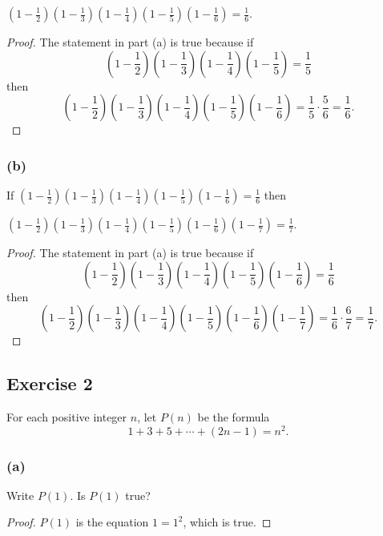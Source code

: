 \documentclass[14pt]{extarticle}
\newcommand{\dps}{\displaystyle}
\begin{document}
$\dps \left(1 - \frac{1}{2}\right)\left(1 - \frac{1}{3}\right)\left(1 - \frac{1}{4}\right)\left(1 - \frac{1}{5}\right)\left(1 - \frac{1}{6}\right) = \frac{1}{6}$.

\begin{proof}
    The statement in part (a) is true because if
    \[
        \dps \left(1 - \frac{1}{2}\right)\left(1 - \frac{1}{3}\right)\left(1 - \frac{1}{4}\right)\left(1 - \frac{1}{5}\right) = \frac{1}{5}
    \]
    then
    \[\dps \left(1 - \frac{1}{2}\right)\left(1 - \frac{1}{3}\right)\left(1 - \frac{1}{4}\right)\left(1 - \frac{1}{5}\right)\left(1 - \frac{1}{6}\right) = \frac{1}{5} \cdot \frac{5}{6} = \frac{1}{6}.
    \]
\end{proof}

\subsubsection{(b)}
If $\dps \left(1 - \frac{1}{2}\right)\left(1 - \frac{1}{3}\right)\left(1 - \frac{1}{4}\right)\left(1 - \frac{1}{5}\right)\left(1 - \frac{1}{6}\right) = \frac{1}{6}$ then

$\dps \left(1 - \frac{1}{2}\right)\left(1 - \frac{1}{3}\right)\left(1 - \frac{1}{4}\right)\left(1 - \frac{1}{5}\right)\left(1 - \frac{1}{6}\right)\left(1 - \frac{1}{7}\right) = \frac{1}{7}$.

\begin{proof}
    The statement in part (a) is true because if
    \[
        \dps \left(1 - \frac{1}{2}\right)\left(1 - \frac{1}{3}\right)\left(1 - \frac{1}{4}\right)\left(1 - \frac{1}{5}\right)\left(1 - \frac{1}{6}\right) = \frac{1}{6}
    \]
    then
    \[\dps \left(1 - \frac{1}{2}\right)\left(1 - \frac{1}{3}\right)\left(1 - \frac{1}{4}\right)\left(1 - \frac{1}{5}\right)\left(1 - \frac{1}{6}\right)\left(1 - \frac{1}{7}\right) = \frac{1}{6} \cdot \frac{6}{7} = \frac{1}{7}.
    \]
\end{proof}

\subsection{Exercise 2}
For each positive integer $n$, let $P(n)$ be the formula
\[
    1 + 3 + 5 + \cdots + (2n - 1) = n^2.
\]
\subsubsection{(a)}
Write $P(1)$. Is $P(1)$ true?

\begin{proof}
    $P(1)$ is the equation $1 = 1^2$, which is true.
\end{proof}
\end{document}
